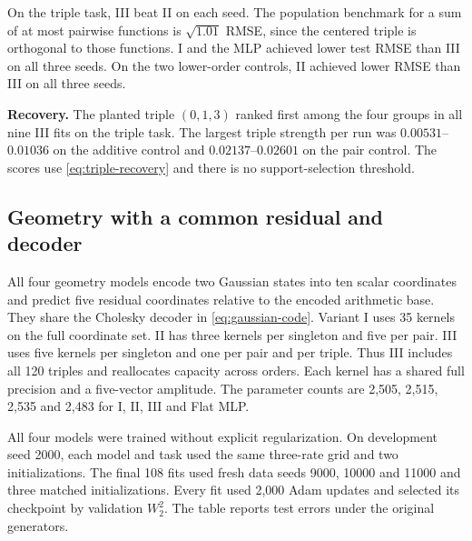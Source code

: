 \documentclass[11pt]{article}
\numberwithin{equation}{section}
\begin{document}
On the triple task, III beat II on each seed. The population benchmark for
a sum of at most pairwise functions is \(\sqrt{1.01}\) RMSE, since the centered
triple is orthogonal to those functions. I and the MLP achieved lower test
RMSE than III on all three seeds. On the two lower-order controls, II
achieved lower RMSE than III on all three seeds.

\textbf{Recovery.} The planted triple \((0,1,3)\) ranked first among the
four groups in all nine III fits on the triple task. The largest triple
strength per run was \(0.00531\)--\(0.01036\) on the additive control and
\(0.02137\)--\(0.02601\) on the pair control. The scores use
\eqref{eq:triple-recovery} and there is no support-selection threshold.

\subsection{Geometry with a common residual and decoder}

All four geometry models encode two Gaussian states into ten scalar
coordinates and predict five residual coordinates relative to the encoded
arithmetic base. They share the Cholesky decoder in
\eqref{eq:gaussian-code}. Variant I uses 35 kernels on the full coordinate
set. II has three kernels per singleton and five per pair. III uses five
kernels per singleton and one per pair and per triple. Thus III includes
all 120 triples and reallocates capacity across orders. Each kernel has
a shared full precision and a five-vector amplitude. The parameter counts
are 2,505, 2,515, 2,535 and 2,483 for I, II, III and Flat MLP.

All four models were trained without explicit regularization. On
development seed 2000, each model and task used the same three-rate
grid and two initializations. The final 108 fits used fresh data seeds
9000, 10000 and 11000 and three matched initializations. Every fit
used 2,000 Adam updates and selected its checkpoint by validation \(W_2^2\).
The table reports test errors under the original generators.
\end{document}
